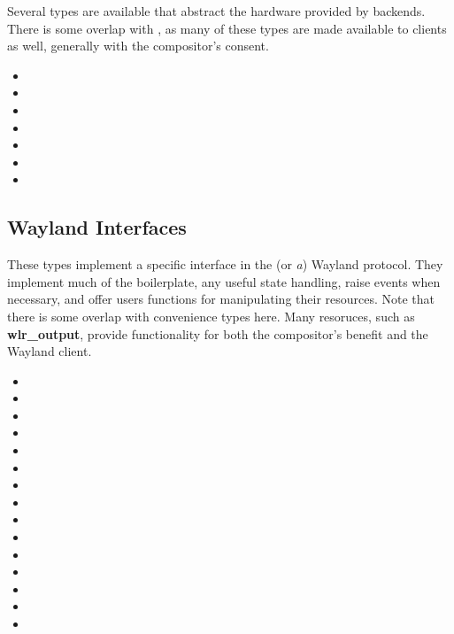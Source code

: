 \documentclass{article}
\begin{document}
Several types are available that abstract the hardware provided by backends.
There is some overlap with , as many of these types
are made available to clients as well, generally with the compositor's consent.

\begin{itemize}
    \itemsep0em
    \item {}
    \item {}
    \item {}
    \item {}
    \item {}
    \item {}
    \item {}
\end{itemize}

\subsection{Wayland Interfaces}\label{wl interfaces}

These types implement a specific interface in the (or \emph{a}) Wayland
protocol. They implement much of the boilerplate, any useful state handling,
raise events when necessary, and offer users functions for manipulating their
resources. Note that there is some overlap with convenience types here. Many
resoruces, such as \textbf{wlr_output}, provide functionality for both the
compositor's benefit and the Wayland client.

\begin{itemize}
    \itemsep0em
    \item {}
    \item {}
    \item {}
    \item {}
    \item {}
    \item {}
    \item {}
    \item {}
    \item {}
    \item {}
    \item {}
    \item {}
    \item {}
    \item {}
    \item {}
\end{itemize}
\end{document}
